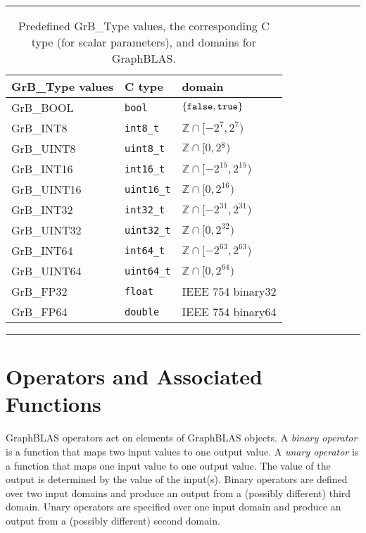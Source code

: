 \begin{table}
\hrule
\begin{center}
\caption{Predefined {\sf GrB\_Type} values, the corresponding C type (for scalar
parameters), and domains for GraphBLAS.}
\label{Tab:PredefinedTypes}
\begin{tabular}{l|l|l}
{\sf GrB\_Type values} & C type            & domain \\
\hline
{\sf GrB\_BOOL}        & {\tt bool}        & $\{ {\tt false}, {\tt true} \}$  \\
{\sf GrB\_INT8}        & {\tt int8\_t}     & $\mathbb{Z} \cap [-2^{7},2^{7})$  \\
{\sf GrB\_UINT8}       & {\tt uint8\_t}    & $\mathbb{Z} \cap [0,2{^8})$  \\
{\sf GrB\_INT16}       & {\tt int16\_t}    & $\mathbb{Z} \cap [-2^{15},2^{15})$ \\
{\sf GrB\_UINT16}      & {\tt uint16\_t}   & $\mathbb{Z} \cap [0,2^{16})$ \\
{\sf GrB\_INT32}       & {\tt int32\_t}    & $\mathbb{Z} \cap [-2^{31},2^{31})$ \\
{\sf GrB\_UINT32}      & {\tt uint32\_t}   & $\mathbb{Z} \cap [0,2^{32})$ \\
{\sf GrB\_INT64}       & {\tt int64\_t}    & $\mathbb{Z} \cap [-2^{63},2^{63})$ \\
{\sf GrB\_UINT64}      & {\tt uint64\_t}   & $\mathbb{Z} \cap [0,2^{64})$ \\
{\sf GrB\_FP32}        & {\tt float}       & IEEE 754 {\sf binary32}  \\
{\sf GrB\_FP64}        & {\tt double}      & IEEE 754 {\sf binary64}  \\
\end{tabular}
\end{center}
\hrule
\end{table}

\section{Operators and Associated Functions }

GraphBLAS operators act on elements of GraphBLAS objects. A \emph{binary
operator} is a function that maps two input values to one output value. A
\emph{unary operator} is a function that maps one input value to one
output value. The value of the output is determined by the value of
the input(s).  Binary operators are defined over two input domains
and produce an output from a (possibly different) third domain. Unary
operators are specified over one input domain and produce an output from a
(possibly different) second domain.

